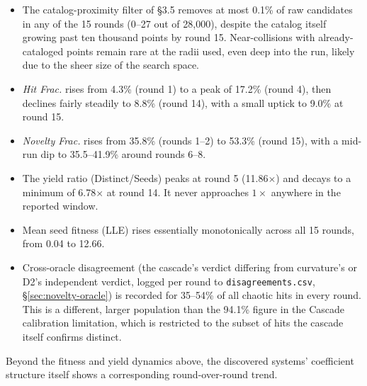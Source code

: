 \documentclass[11pt]{article}
\begin{document}
\begin{itemize}
  \item The catalog-proximity filter of \S3.5 removes at most 0.1\% of raw
  candidates in any of the 15 rounds (0--27 out of 28{,}000), despite the
  catalog itself growing past ten thousand points by round 15. Near-collisions
  with already-cataloged points remain rare at the radii used, even deep
  into the run, likely due to the sheer size of the search space.
  \item \emph{Hit Frac.} rises from 4.3\% (round 1) to a peak of 17.2\% (round
  4), then declines fairly steadily to 8.8\% (round 14), with a small uptick
  to 9.0\% at round 15.
  \item \emph{Novelty Frac.} rises from 35.8\% (rounds 1--2) to 53.3\%
  (round 15), with a mid-run dip
  to 35.5--41.9\% around rounds 6--8.
  \item The yield ratio (Distinct/Seeds) peaks at round 5 (11.86$\times$) and
  decays to a minimum of 6.78$\times$ at round 14. It never approaches
  $1\times$ anywhere in the reported window.
  \item Mean seed fitness (LLE) rises essentially monotonically across all 15
  rounds, from 0.04 to 12.66.
  \item Cross-oracle disagreement (the cascade's verdict differing from
  curvature's or D2's independent verdict, logged per round to
  \texttt{disagreements.csv}, \S\ref{sec:novelty-oracle}) is recorded for
  35--54\% of all chaotic hits in every round. This is a different, larger
  population than the 94.1\% figure in the Cascade calibration limitation,
  which is
  restricted to the subset of hits the cascade itself confirms distinct.
\end{itemize}

Beyond the fitness and yield dynamics above, the discovered systems'
coefficient structure itself shows a corresponding round-over-round trend.
\end{document}
